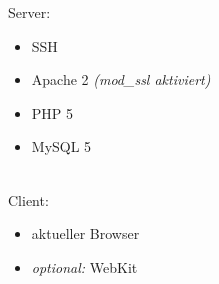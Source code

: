 Server:
\begin{itemize}
    \item SSH
	\item Apache 2 \textit{(mod_ssl aktiviert)}
	\item PHP 5
	\item MySQL 5
\end{itemize}
\\
Client: 
\begin{itemize}
	\item aktueller Browser
    \item \textit{optional:} WebKit
\end{itemize}